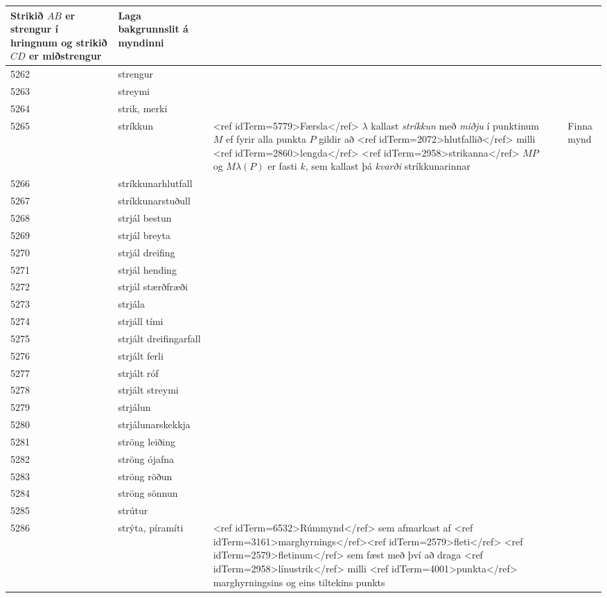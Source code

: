 \begin{longtable}{p{}|p{}|p{}|p{}|p{}}
Strikið $AB$ er strengur í hringnum og strikið $CD$ er miðstrengur & Laga bakgrunnslit á myndinni \\
\hline
5262 & strengur &  &  &  \\
\hline
5263 & streymi &  &  &  \\
\hline
5264 & strik, merki &  &  &  \\
\hline
5265 & stríkkun & <ref idTerm=5779>Færsla</ref> $\lambda$ kallast \textit{stríkkun} með \textit{miðju} í punktinum $M$ ef fyrir alla punkta $P$ gildir að <ref idTerm=2072>hlutfallið</ref> milli <ref idTerm=2860>lengda</ref> <ref idTerm=2958>strikanna</ref> $MP$ og $M\lambda(P)$ er fasti $k$, sem kallast þá \textit{kvarði} stríkkunarinnar &  & Finna mynd \\
\hline
5266 & stríkkunarhlutfall &  &  &  \\
\hline
5267 & stríkkunarstuðull &  &  &  \\
\hline
5268 & strjál bestun &  &  &  \\
\hline
5269 & strjál breyta &  &  &  \\
\hline
5270 & strjál dreifing &  &  &  \\
\hline
5271 & strjál hending &  &  &  \\
\hline
5272 & strjál stærðfræði &  &  &  \\
\hline
5273 & strjála &  &  &  \\
\hline
5274 & strjáll tími &  &  &  \\
\hline
5275 & strjált dreifingarfall &  &  &  \\
\hline
5276 & strjált ferli &  &  &  \\
\hline
5277 & strjált róf &  &  &  \\
\hline
5278 & strjált streymi &  &  &  \\
\hline
5279 & strjálun &  &  &  \\
\hline
5280 & strjálunarskekkja &  &  &  \\
\hline
5281 & ströng leiðing &  &  &  \\
\hline
5282 & ströng ójafna &  &  &  \\
\hline
5283 & ströng röðun &  &  &  \\
\hline
5284 & ströng sönnun &  &  &  \\
\hline
5285 & strútur &  &  &  \\
\hline
5286 & strýta, píramíti & <ref idTerm=6532>Rúmmynd</ref> sem afmarkast af <ref idTerm=3161>marghyrnings</ref><ref idTerm=2579>fleti</ref> <ref idTerm=2579>fletinum</ref> sem fæst með því að draga <ref idTerm=2958>línustrik</ref> milli <ref idTerm=4001>punkta</ref> marghyrningsins og eins tiltekins punkts &  &  \\

\end{longtable}
